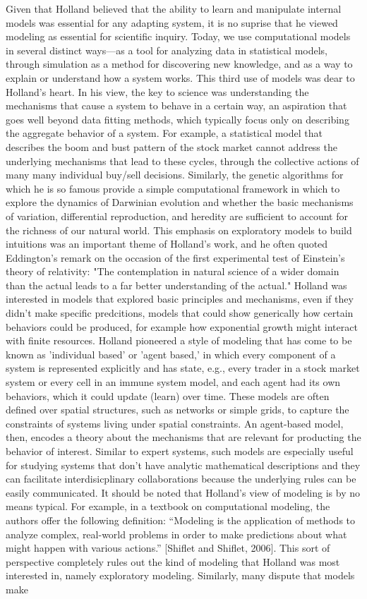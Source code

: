 \documentclass{sig-alternate}
\begin{document}
Given that Holland believed that the ability to learn and manipulate internal models was essential for any adapting system, it is no suprise that he viewed modeling as essential for scientific inquiry.  
Today, we use computational models in several distinct ways---as a tool for analyzing data in statistical models, through simulation as a method for discovering new knowledge, and as a way to explain or understand how a system works.  This third use of models was dear to Holland's heart.  In his view, the key to science was understanding the mechanisms that cause a system to behave in a certain way, an aspiration that goes well beyond data fitting methods, which typically focus only on describing the aggregate behavior of a system.  For example, a statistical model that describes the boom and bust pattern of the stock market cannot address the underlying mechanisms that lead to these cycles, through the collective actions of many many individual buy/sell decisions.  Similarly, the genetic algorithms for which he is so famous provide a simple computational framework in which to explore the dynamics of Darwinian evolution and whether the basic mechanisms of variation, differential reproduction, and heredity are sufficient to account for the richness of our natural world.  This emphasis on exploratory models to build intuitions was an important theme of Holland's work, and he often quoted Eddington's remark on the occasion of the first experimental test of Einstein's theory of relativity: "The contemplation in natural science of a wider domain than the actual leads to a far better understanding of the actual."  Holland was interested in models that explored basic principles and mechanisms, even if they didn't make specific predcitions, models that could show generically how certain behaviors could be produced, for example how exponential growth might interact with finite resources.  Holland pioneered a style of modeling that has come to be known as 'individual based' or 'agent based,' in which every component of a system is represented explicitly and has state, e.g., every trader in a stock market system or every cell in an immune system model, and each agent had its own behaviors, which it could update (learn) over time.  These models are often defined over spatial structures, such as networks or simple grids, to capture the constraints of systems living under spatial constraints.  An agent-based model, then, encodes a theory about the mechanisms that are relevant for producting the behavior of interest.  Similar to expert systems, such models are especially useful for studying systems that don't have analytic mathematical descriptions and they can facilitate interdisicplinary collaborations because the underlying rules can be easily communicated.  It should be noted that Holland's view of modeling is by no means typical.  For example, in a textbook on computational modeling, the authors offer the following definition:  “Modeling is the application of methods to analyze complex, real-world problems in order to make predictions about what might happen with various actions.” [Shiflet and Shiflet, 2006].  This sort of perspective completely rules out the kind of modeling that Holland was most interested in, namely exploratory modeling.  Similarly, many dispute that models make 
\end{document}
